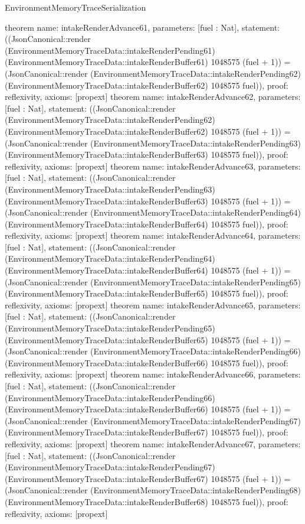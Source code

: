 \begin{lexlean}{EnvironmentMemoryTraceSerialization}
\begin{semanticmodule}
{}
theorem{
 name: intakeRenderAdvance61, parameters: [fuel : Nat],
 statement: ((JsonCanonical::render (EnvironmentMemoryTraceData::intakeRenderPending61) (EnvironmentMemoryTraceData::intakeRenderBuffer61) 1048575 (fuel + 1)) = (JsonCanonical::render (EnvironmentMemoryTraceData::intakeRenderPending62) (EnvironmentMemoryTraceData::intakeRenderBuffer62) 1048575 fuel)), proof: reflexivity{}, axioms: [propext]
}
theorem{
 name: intakeRenderAdvance62, parameters: [fuel : Nat],
 statement: ((JsonCanonical::render (EnvironmentMemoryTraceData::intakeRenderPending62) (EnvironmentMemoryTraceData::intakeRenderBuffer62) 1048575 (fuel + 1)) = (JsonCanonical::render (EnvironmentMemoryTraceData::intakeRenderPending63) (EnvironmentMemoryTraceData::intakeRenderBuffer63) 1048575 fuel)), proof: reflexivity{}, axioms: [propext]
}
theorem{
 name: intakeRenderAdvance63, parameters: [fuel : Nat],
 statement: ((JsonCanonical::render (EnvironmentMemoryTraceData::intakeRenderPending63) (EnvironmentMemoryTraceData::intakeRenderBuffer63) 1048575 (fuel + 1)) = (JsonCanonical::render (EnvironmentMemoryTraceData::intakeRenderPending64) (EnvironmentMemoryTraceData::intakeRenderBuffer64) 1048575 fuel)), proof: reflexivity{}, axioms: [propext]
}
theorem{
 name: intakeRenderAdvance64, parameters: [fuel : Nat],
 statement: ((JsonCanonical::render (EnvironmentMemoryTraceData::intakeRenderPending64) (EnvironmentMemoryTraceData::intakeRenderBuffer64) 1048575 (fuel + 1)) = (JsonCanonical::render (EnvironmentMemoryTraceData::intakeRenderPending65) (EnvironmentMemoryTraceData::intakeRenderBuffer65) 1048575 fuel)), proof: reflexivity{}, axioms: [propext]
}
theorem{
 name: intakeRenderAdvance65, parameters: [fuel : Nat],
 statement: ((JsonCanonical::render (EnvironmentMemoryTraceData::intakeRenderPending65) (EnvironmentMemoryTraceData::intakeRenderBuffer65) 1048575 (fuel + 1)) = (JsonCanonical::render (EnvironmentMemoryTraceData::intakeRenderPending66) (EnvironmentMemoryTraceData::intakeRenderBuffer66) 1048575 fuel)), proof: reflexivity{}, axioms: [propext]
}
theorem{
 name: intakeRenderAdvance66, parameters: [fuel : Nat],
 statement: ((JsonCanonical::render (EnvironmentMemoryTraceData::intakeRenderPending66) (EnvironmentMemoryTraceData::intakeRenderBuffer66) 1048575 (fuel + 1)) = (JsonCanonical::render (EnvironmentMemoryTraceData::intakeRenderPending67) (EnvironmentMemoryTraceData::intakeRenderBuffer67) 1048575 fuel)), proof: reflexivity{}, axioms: [propext]
}
theorem{
 name: intakeRenderAdvance67, parameters: [fuel : Nat],
 statement: ((JsonCanonical::render (EnvironmentMemoryTraceData::intakeRenderPending67) (EnvironmentMemoryTraceData::intakeRenderBuffer67) 1048575 (fuel + 1)) = (JsonCanonical::render (EnvironmentMemoryTraceData::intakeRenderPending68) (EnvironmentMemoryTraceData::intakeRenderBuffer68) 1048575 fuel)), proof: reflexivity{}, axioms: [propext]
}
\end{semanticmodule}
\end{lexlean}

